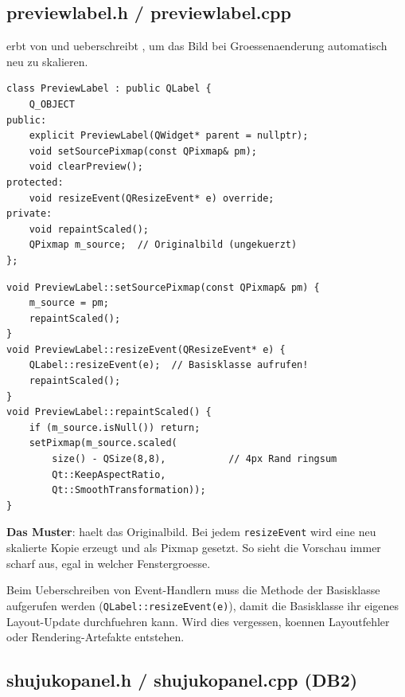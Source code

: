 \subsection{previewlabel.h / previewlabel.cpp}

 erbt von  und
ueberschreibt , um das Bild bei
Groessenaenderung automatisch neu zu skalieren.

\begin{lstlisting}[style=header, caption={previewlabel.h}]
class PreviewLabel : public QLabel {
    Q_OBJECT
public:
    explicit PreviewLabel(QWidget* parent = nullptr);
    void setSourcePixmap(const QPixmap& pm);
    void clearPreview();
protected:
    void resizeEvent(QResizeEvent* e) override;
private:
    void repaintScaled();
    QPixmap m_source;  // Originalbild (ungekuerzt)
};
\end{lstlisting}

\begin{lstlisting}[caption={previewlabel.cpp -- Kern}]
void PreviewLabel::setSourcePixmap(const QPixmap& pm) {
    m_source = pm;
    repaintScaled();
}
void PreviewLabel::resizeEvent(QResizeEvent* e) {
    QLabel::resizeEvent(e);  // Basisklasse aufrufen!
    repaintScaled();
}
void PreviewLabel::repaintScaled() {
    if (m_source.isNull()) return;
    setPixmap(m_source.scaled(
        size() - QSize(8,8),           // 4px Rand ringsum
        Qt::KeepAspectRatio,
        Qt::SmoothTransformation));
}
\end{lstlisting}

\textbf{Das Muster}:  haelt das
Originalbild. Bei jedem \verb|resizeEvent| wird eine
neu skalierte Kopie erzeugt und als Pixmap gesetzt.
So sieht die Vorschau immer scharf aus, egal in welcher
Fenstergroesse.

\begin{hinweis}
Beim Ueberschreiben von Event-Handlern muss die Methode
der Basisklasse aufgerufen werden
(\verb|QLabel::resizeEvent(e)|), damit die Basisklasse
ihr eigenes Layout-Update durchfuehren kann. Wird dies
vergessen, koennen Layoutfehler oder Rendering-Artefakte
entstehen.
\end{hinweis}

\subsection{shujukopanel.h / shujukopanel.cpp (DB2)}

